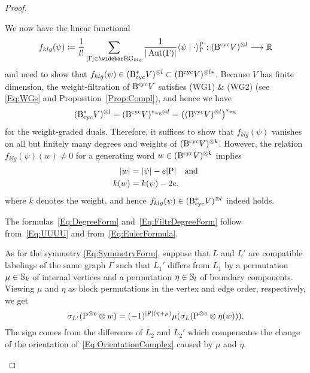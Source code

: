 \documentclass[\MainFolder/Text.tex]{subfiles}
\begin{document}
\begin{proof}
\begin{ProofList}
We now have the linear functional 
\[ f_{klg}(\psi) \coloneqq \frac{1}{l!}\sum_{[\Gamma]\in \RRG_{klg} } \frac{1}{\Abs{\Aut(\Gamma)}} \langle \psi \mid \cdot \rangle_\Gamma^{\Prpg}: (\BCyc V)^{\otimes l} \longrightarrow \R \] 
and need to show that $f_{klg}(\psi)\in (\mathrm{B}_{\mathrm{cyc}}^* V)^{\otimes l} \subset (\mathrm{B}^{\mathrm{cyc}} V)^{\otimes l*}$. Because $V$ has finite dimension, the weight-filtration of $\mathrm{B}^{\mathrm{cyc}} V$ satisfies (WG1) \& (WG2) (see \eqref{Eq:WGs} and Proposition~\ref{Prop:Compl}), and hence we have
\[ (\mathrm{B}_{\mathrm{cyc}}^* V)^{\otimes l} = (\mathrm{B}^{\mathrm{cyc}} V)^{*_{\mathrm{wg}} \otimes l} =\bigl((\mathrm{B}^{\mathrm{cyc}} V)^{\otimes l}\bigr)^{*_{\mathrm{wg}}} \]
for the weight-graded duals. Therefore, it suffices to show that $f_{klg}(\psi)$ vanishes on all but finitely many degrees and weights of $(\mathrm{B}^{\mathrm{cyc}} V)^{\otimes k}$. However, the relation $f_{klg}(\psi)(w) \neq 0$ for a generating word $w\in (\mathrm{B}^{\mathrm{cyc}} V)^{\otimes k}$ implies
\begin{equation}\label{Eq:UUUU}
\begin{aligned}
|w| &= |\psi| - e |\mathrm{P}|\quad\text{and} \\
k(w) &= k(\psi) - 2 e,
\end{aligned}
\end{equation}
where $k$ denotes the weight, and hence $f_{klg}(\psi)\in (\mathrm{B}_{\mathrm{cyc}}^* V)^{\otimes l}$ indeed holds.

\item The formulas~\eqref{Eq:DegreeForm} and~\eqref{Eq:FiltrDegreeForm} follow from~\eqref{Eq:UUUU} and from~\eqref{Eq:EulerFormula}.

As for the symmetry \eqref{Eq:SymmetryForm}, suppose that $L$ and $L'$ are compatible labelings of the same graph $\Gamma$ such that $L_1'$ differs from $L_1$ by a permutation $\mu\in \mathbb{S}_{k}$ of internal vertices and a permutation $\eta\in \mathbb{S}_l$ of boundary components. Viewing $\mu$ and $\eta$ as block permutations in the vertex and edge order, respectively, we get
\[ \sigma_{L'}(\mathrm{P}^{\otimes e}\otimes w)=(-1)^{|\mathrm{P}|(\eta+\mu)}\mu(\sigma_L(\mathrm{P}^{\otimes e}\otimes \eta( w))). \]
The sign comes from the difference of $L_2$ and $L_2'$ which compensates the change of the orientation of~\eqref{Eq:OrientationComplex} caused by $\mu$ and $\eta$.\qedhere
\end{ProofList}
\end{proof}
\end{document}
